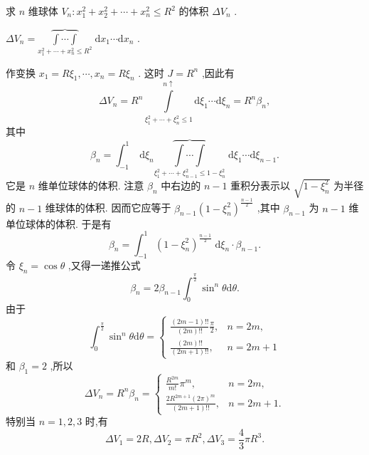 \begin{example}

\end{example}
求 \(n\) 维球体 \({V}_{n} : {x}_{1}^{2} + {x}_{2}^{2} + \cdots  + {x}_{n}^{2} \leq  {R}^{2}\) 的体积 \(\Delta {V}_{n}\) .

\begin{solution}

\end{solution}
\(\Delta {V}_{n} = \underset{{x}_{1}^{2} + \cdots  + {x}_{n}^{2} \leq  {R}^{2}}{\overbrace{\int \cdots \int }}\mathrm{\;d}{x}_{1}\cdots \mathrm{d}{x}_{n}\) .

作变换 \({x}_{1} = R{\xi }_{1},\cdots ,{x}_{n} = R{\xi }_{n}\) . 这时 \(J = {R}^{n}\) ,因此有
\[
\Delta {V}_{n} = {R}^{n}\mathop{\int }\limits_{{{\xi }_{1}^{2} + \cdots  + {\xi }_{n}^{2} \leq  1}}^{{n \uparrow  }}\mathrm{d}{\xi }_{1}\cdots \mathrm{d}{\xi }_{n} = {R}^{n}{\beta }_{n},
\]
其中
\[
{\beta }_{n} = {\int }_{-1}^{1}\mathrm{\;d}{\xi }_{n}\underset{{\xi }_{1}^{2} + \cdots  + {\xi }_{n - 1}^{2} \leq  1 - {\xi }_{n}^{2}}{\overbrace{\int \cdots \int }}\mathrm{\;d}{\xi }_{1}\cdots \mathrm{d}{\xi }_{n - 1}.
\]
它是 \(n\) 维单位球体的体积. 注意 \({\beta }_{n}\) 中右边的 \(n - 1\) 重积分表示以 \(\sqrt{1 - {\xi }_{n}^{2}}\) 为半径的 \(n - 1\) 维球体的体积. 因而它应等于 \({\beta }_{n - 1}{\left( 1 - {\xi }_{n}^{2}\right) }^{\frac{n - 1}{2}}\) ,其中 \({\beta }_{n - 1}\) 为 \(n - 1\) 维单位球体的体积. 于是有
\[
{\beta }_{n} = {\int }_{-1}^{1}{\left( 1 - {\xi }_{n}^{2}\right) }^{\frac{n - 1}{2}}\mathrm{\;d}{\xi }_{n} \cdot  {\beta }_{n - 1}.
\]
令 \({\xi }_{n} = \cos \theta\) ,又得一递推公式
\[
{\beta }_{n} = 2{\beta }_{n - 1}{\int }_{0}^{\frac{\pi }{2}}{\sin }^{n}\theta \mathrm{d}\theta .
\]
由于
\[
{\int }_{0}^{\frac{\pi }{2}}{\sin }^{n}\theta \mathrm{d}\theta  = \left\{  \begin{array}{ll} \frac{\left( {{2m} - 1}\right) !!}{\left( {2m}\right) !!}\frac{\pi }{2}, & n = {2m}, \\  \frac{\left( {2m}\right) !!}{\left( {{2m} + 1}\right) !!}, & n = {2m} + 1 \end{array}\right.
\]
和 \({\beta }_{1} = 2\) ,所以
\[
\Delta {V}_{n} = {R}^{n}{\beta }_{n} = \left\{  \begin{array}{ll} \frac{{R}^{2m}}{m!}{\pi }^{m}, & n = {2m}, \\  \frac{2{R}^{{2m} + 1}{\left( 2\pi \right) }^{m}}{\left( {{2m} + 1}\right) !!}, & n = {2m} + 1. \end{array}\right.
\]
特别当 \(n = 1,2,3\) 时,有
\[
\Delta {V}_{1} = {2R},\Delta {V}_{2} = \pi {R}^{2},\Delta {V}_{3} = \frac{4}{3}\pi {R}^{3}.
\]
